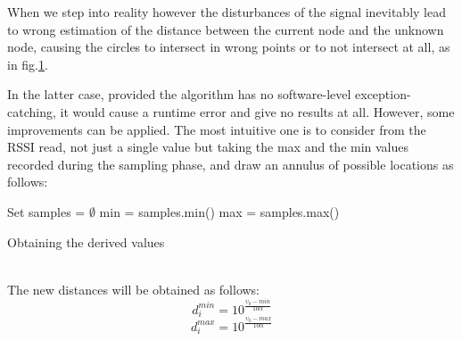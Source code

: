 \documentclass[12pt]{report}
\begin{document}
When we step into reality however the disturbances of the signal inevitably lead to wrong estimation of the distance between the current node and the unknown node, causing the circles to intersect in wrong points or to not intersect at all, as in fig.\ref{fig:trilKO}.
\begin{figure}
    \centering
    \caption{}
    \label{fig:trilKO}
\end{figure}
In the latter case, provided the algorithm has no software-level exception-catching, it would cause a runtime error and give no results at all. However, some improvements can be applied. The most intuitive one is to consider from the RSSI read, not just a single value but taking the max and the min values recorded during the sampling phase, and draw an annulus of possible locations as follows:
\begin{algorithm}[H]
\SetAlgoLined
{}
 Set samples = $\emptyset$\;
 min = samples.min()\;
 max = samples.max()\;
 \caption{Obtaining the derived values}
\end{algorithm}
\noindent\\The new distances will be obtained as follows:
\begin{equation}
    d_i^{min}=10^{\frac{\upsilon_0-min}{10\alpha}}    
\end{equation}
\begin{equation}
    d_i^{max}=10^{\frac{\upsilon_0-max}{10\alpha}}    
\end{equation}
\end{document}
